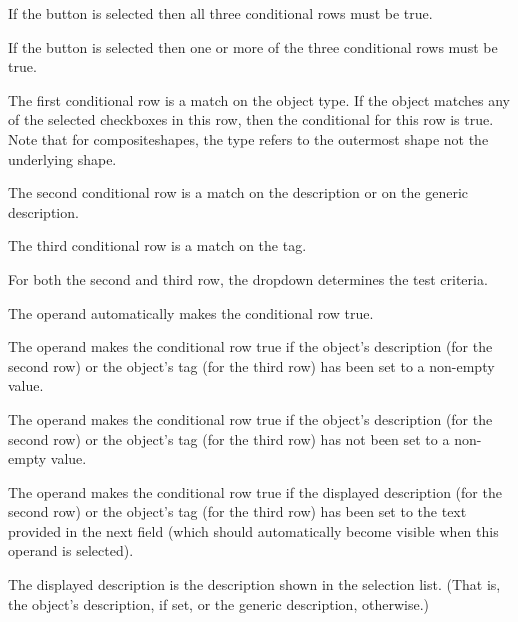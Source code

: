 If the  button is selected then
all three conditional rows must be true.

If the  button is selected then
one or more of the three conditional rows must be true.

The first conditional row is a match on the object type. If the
object matches any of the selected checkboxes in this row, then the
conditional for this row is true. Note that for
\glspl{compositeshape}, the type refers to the outermost shape not
the underlying shape.

The second conditional row is a match on the description or on the
generic description. 

The third conditional row is a match on the tag. 

For both the second and third row, the 
 \gls{dropdown} determines
the test criteria.

The  operand
automatically makes the conditional row true.

The  operand makes the
conditional row
true if the object's description (for the second row) or the
object's tag (for the third row) has been set to a non-empty value.

The  operand makes the
conditional row
true if the object's description (for the second row) or the
object's tag (for the third row) has not been set to a non-empty value.

The  operand makes the
conditional row
true if the displayed description (for the second row) or the
object's tag (for the third row) has been set to the text provided
in the next field (which should automatically become visible when
this operand is selected).

The displayed description is the description shown in the selection
list. (That is, the object's description, if set, or the generic
description, otherwise.)

